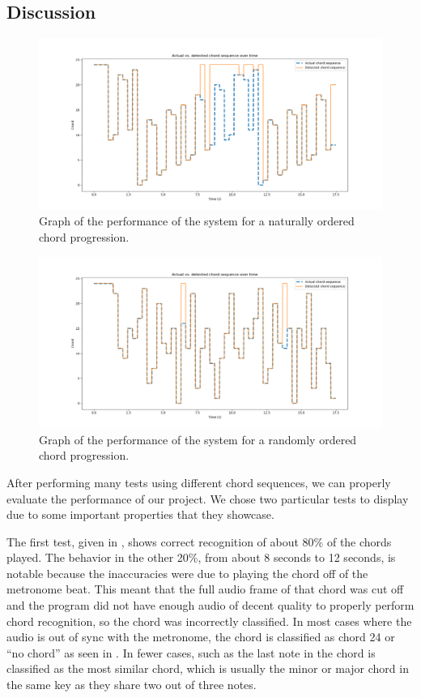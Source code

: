 \documentclass[journal]{IEEEtran}
\begin{document}
\subsection{Discussion}

\begin{figure}[!t]
    \centering
    \includegraphics[width = \linewidth]{../Figures/chord_sequence_in_order}
    \caption{Graph of the performance of the system for a naturally ordered chord progression.}
    \label{fig:in_order}
\end{figure}
\begin{figure}[!t]
    \centering
    \includegraphics[width = \linewidth]{../Figures/chord_sequence_random}
    \caption{Graph of the performance of the system for a randomly ordered chord progression.}
    \label{fig:random}
\end{figure}

After performing many tests using different chord sequences, we can properly evaluate the performance of our project.
We chose two particular tests to display due to some important properties that they showcase.

The first test, given in , shows correct recognition of about 80\% of the chords played.
The behavior in the other 20\%, from about 8 seconds to 12 seconds, is notable because the inaccuracies were due to playing the chord off of the metronome beat.
This meant that the full audio frame of that chord was cut off and the program did not have enough audio of decent quality to properly perform chord recognition, so the chord was incorrectly classified.
In most cases where the audio is out of sync with the metronome, the chord is classified as chord 24 or “no chord” as seen in .
In fewer cases, such as the last note in  the chord is classified as the most similar chord, which is usually the minor or major chord in the same key  as they share two out of three notes.
\end{document}
